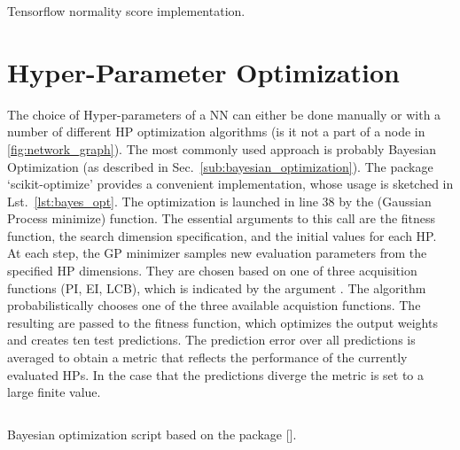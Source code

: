 \begin{listing}
  \inputminted{py}{pseudocode/score.py}
  \caption{Tensorflow normality score implementation.}
  \label{lst:score}
\end{listing}


\section{Hyper-Parameter Optimization}%
\label{sec:impl_hyper_parameter_optimization}

The choice of Hyper-parameters of a NN can either be done manually or with a
number of different HP optimization algorithms (is it not a part of a node in
\ref{fig:network_graph}). The most commonly used approach is probably Bayesian
Optimization (as described in Sec.~\ref{sub:bayesian_optimization}).  The
package `scikit-optimize' provides a convenient implementation, whose usage is
sketched in Lst.~\ref{lst:bayes_opt}.  The optimization is launched in line 38
by the  (Gaussian Process minimize) function. The
essential arguments to this call are the fitness function, the search dimension
specification, and the initial values for each HP.  At each step, the GP
minimizer samples new evaluation parameters from the specified HP dimensions.
They are chosen based on one of three acquisition functions (PI, EI, LCB),
which is indicated by the argument . The algorithm
probabilistically chooses one of the three available acquistion functions.  The
resulting  are passed to the fitness function, which
optimizes the output weights and creates ten test predictions.  The prediction
error over all predictions is averaged to obtain a metric that reflects the
performance of the currently evaluated HPs. In the case that the predictions
diverge the metric is set to a large finite value.

\begin{listing}
  \inputminted{py}{pseudocode/hparam_opt.py}
  \caption{Bayesian optimization script based on the package [\cite{skopt}].}
  \label{lst:bayes_opt}
\end{listing}
